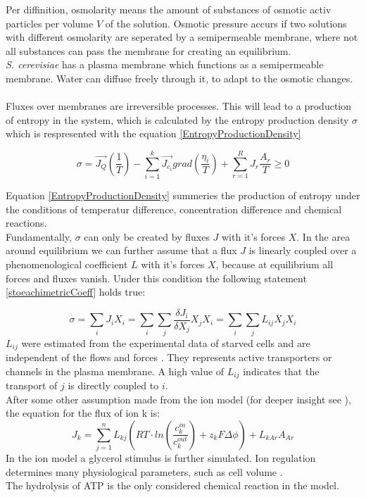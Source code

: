 Per diffinition, osmolarity means the amount of substances of osmotic activ particles per volume $V$ of the solution. Osmotic pressure accurs if two solutions with different osmolarity are seperated by a semipermeable membrane, where not all substances can pass the membrane for creating an equilibrium.\\
\emph{S. cerevisiae} has a plasma membrane which functions as a semipermeable membrane. Water can diffuse freely through it, to adapt to the osmotic changes. \\\\

Fluxes over membranes are irreversible processes. This will lead to a production of entropy in the system, which is calculated by the entropy production density $\sigma$ which is respresented with the equation \ref{EntropyProductionDensity}

\begin{equation}\label{EntropyProductionDensity}
	\sigma = \vec{J_Q}\left(\frac{1}{T}\right) - \sum_{i=1}^{k}\vec{J_{c_i}}grad \left(\frac{\eta _i}{T}\right) + \sum_{r=1}^{R}J_r \frac{A_r}{T} \geq 0
\end{equation}

Equation \ref{EntropyProductionDensity} summeries the production of entropy under the conditions of temperatur difference, concentration difference and chemical reactions. \\
Fundamentally, $\sigma$ can only be created by fluxes $J$ with it’s forces $X$. In the area around equilibrium we can further assume that a flux $J$ is linearly coupled over a phenomenological coefficient $L$ with it’s forces $X$, because at equilibrium all forces and fluxes vanish. Under this condition the following statement \ref{stoeachimetricCoeff} holds true:

\begin{equation}\label{stoeachimetricCoeff}
	\sigma = \sum_{i}J_i X_i = \sum_{i}\sum_{j} \frac{\delta J_i}{\delta X_j}X_j X_i= \sum_{i}\sum_{j}L_{ij}X_j X_i
\end{equation}
$L_{ij}$ were estimated from the experimental data of starved cells and are independent of the flows and forces \cite{Gerber_2016}. They represents active transporters or channels in the plasma membrane. A high value of $L_{ij}$ indicates that the transport of $j$ is directly coupled to $i$. \\
After some other assumption made from the ion model (for deeper insight see \cite{Gerber_2016}), the equation for the flux of ion k is:
\begin{equation}\label{IonFlux}
J_k = \sum_{j=1}^n L_{kj}(RT\cdot ln\left(\frac{c_k^{in}}{c_k^{out}}\right) + z_kF\Delta \phi ) + L_{kAr}A_{Ar}
\end{equation}
In the ion model a glycerol stimulus is further simulated. Ion regulation determines many physiological parameters, such as cell volume \cite{Ke_2013}.\\
The hydrolysis of ATP is the only considered chemical reaction in the model.

